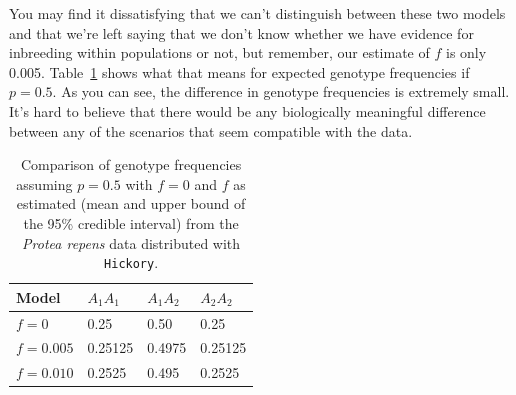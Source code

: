\documentclass[12pt]{article}
\begin{document}
You may find it dissatisfying that we can't distinguish between these
two models and that we're left saying that we don't know whether we
have evidence for inbreeding within populations or not, but remember,
our estimate of $f$ is only
0.005. Table~\ref{table:f-model-comparison} shows what that means for
expected genotype frequencies if $p = 0.5$. As you can see, the
difference in genotype frequencies is extremely small. It's hard to
believe that there would be any biologically meaningful difference
between any of the scenarios that seem compatible with the data.

\begin{table}
  \begin{center}
    \begin{tabular}{l|lll}
      \hline\hline
      Model       & $A_1A_1$ & $A_1A_2$ & $A_2A_2$ \\
      \hline
      $f = 0$     & 0.25     & 0.50    & 0.25 \\
      $f = 0.005$ & 0.25125  & 0.4975  & 0.25125 \\
      $f = 0.010$ & 0.2525   & 0.495   & 0.2525 \\
      \hline
    \end{tabular}
  \end{center}
  \caption{Comparison of genotype frequencies assuming $p = 0.5$ with
    $f = 0$ and $f$ as estimated (mean and upper bound of the 95\%
    credible interval) from the {\it Protea repens\/} data distributed
    with {\tt Hickory}.}\label{table:f-model-comparison}
\end{table}




\ccLicense
\end{document}
